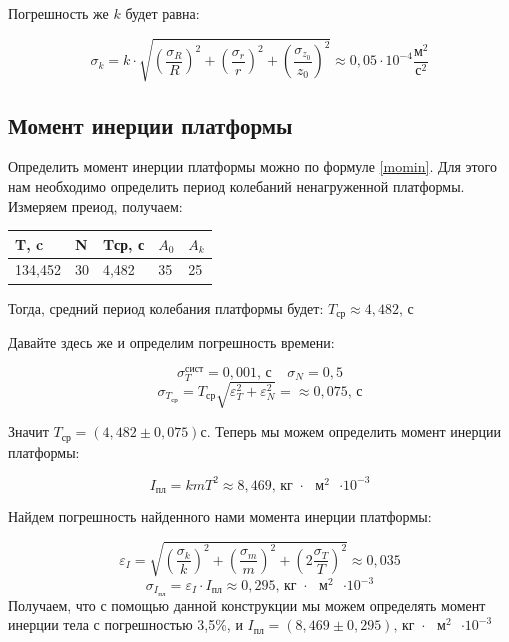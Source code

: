 \documentclass[a4paper,14pt]{extarticle}
\begin{document}
	Погрешность же $k$ будет равна:
	
	\begin{equation}
		\sigma_k = k \cdot \sqrt{\left( \frac{\sigma_R}{R}\right)^2 + \left( \frac{\sigma_r}{r}\right)^2 + \left( \frac{\sigma_{z_0}}{z_0}\right)^2} \approx 0,05 \cdot 10^{-4} \frac{\text{м}^2}{\text{с}^2}
	\end{equation}
	
	\subsection{Момент инерции платформы}
	
	Определить момент инерции платформы можно по формуле \eqref{momin}. Для этого нам необходимо определить период колебаний ненагруженной платформы. Измеряем преиод, получаем:
	
	\begin{table}[!ht]
		\begin{center}
			\begin{tabular}{|l|l|l|l|l|}
				\hline
				T, c & N & Tср, с & $A_0$ & $A_k$ \\ \hline
				134,452 & 30 & 4,482 & 35 & 25 \\ \hline
			\end{tabular}
		\end{center}
	\end{table}
	
	Тогда, средний период колебания платформы будет: $T_\text{ср} \approx 4,482\text{, с}$
	
	Давайте здесь же и определим погрешность времени: 
	
	$$\sigma_T^{\text{сист}} = 0,001\text{, с}\;\;\;\;\sigma_N = 0,5$$
	$$\sigma_{T_\text{ср}} = T_\text{ср}\sqrt{\varepsilon_T^{2} + \varepsilon_{N}^{2}} =\approx 0,075\text{, с}$$
	
	Значит $T_\text{ср} = \left(4,482 \pm 0,075\right)\text{с}$. Теперь мы можем определить момент инерции платформы:
	
	\begin{equation}
		I_\text{пл} = kmT^2 \approx 8,469  \text{,  кг $\cdot$ $\text{м}^2$ $\cdot 10^{-3}$}  
	\end{equation}
	
	Найдем погрешность найденного нами момента инерции платформы:
	
	\begin{equation}
		\varepsilon_I = \sqrt{ \left(\frac{\sigma_k}{k}\right)^2 +\left(\frac{\sigma_m}{m}\right)^2 + \left(2\frac{\sigma_T}{T}\right)^2} \approx 0,035
	\end{equation}
	\begin{equation}
		\sigma_{I_\text{пл}} = \varepsilon_I \cdot I_\text{пл} \approx 0,295 \text{,  кг $\cdot$ $\text{м}^2$ $\cdot 10^{-3}$}
	\end{equation}
	Получаем, что с помощью данной конструкции мы можем определять момент инерции тела с погрешностью 3,5\%, и $I_\text{пл} = \left(8,469 \pm 0,295\right) \text{,  кг $\cdot$ $\text{м}^2$ $\cdot 10^{-3}$}$
	
\end{document}
